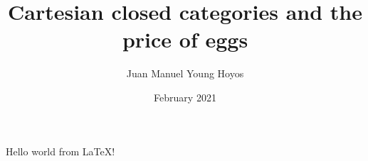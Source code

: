 \documentclass{article}
\title{Cartesian closed categories and the price of eggs}
\author{Juan Manuel Young Hoyos}
\date{February 2021}
\begin{document}
   \maketitle
   Hello world from LaTeX!
\end{document}

